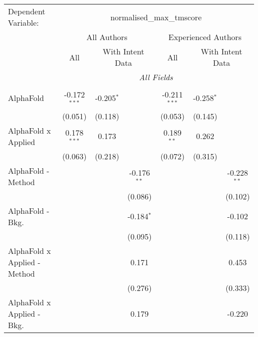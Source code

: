 \begingroup
\centering
\begin{tabular}{lcccccc}
   \tabularnewline \midrule \midrule
   Dependent Variable: & \multicolumn{6}{c}{normalised\_max\_tmscore}\\
 & \multicolumn{3}{c}{All Authors} & \multicolumn{3}{c}{Experienced Authors} \\
\cmidrule(lr){2-4} \cmidrule(lr){5-7}
 & \multicolumn{1}{c}{All} & \multicolumn{2}{c}{With Intent Data} & \multicolumn{1}{c}{All} & \multicolumn{2}{c}{With Intent Data} \\
\cmidrule(lr){2-2} \cmidrule(lr){3-4} \cmidrule(lr){5-5} \cmidrule(lr){6-7}
 & \multicolumn{6}{c}{\textit{All Fields}} \\ \\
   AlphaFold                      & -0.172$^{***}$ & -0.205$^{*}$  &               & -0.211$^{***}$ & -0.258$^{*}$  &   \\   
                                  & (0.051)        & (0.118)       &               & (0.053)        & (0.145)       &   \\   
   AlphaFold x Applied            & 0.178$^{***}$  & 0.173         &               & 0.189$^{**}$   & 0.262         &   \\   
                                  & (0.063)        & (0.218)       &               & (0.072)        & (0.315)       &   \\   
   AlphaFold - Method             &                &               & -0.176$^{**}$ &                &               & -0.228$^{**}$\\   
                                  &                &               & (0.086)       &                &               & (0.102)\\   
   AlphaFold - Bkg.               &                &               & -0.184$^{*}$  &                &               & -0.102\\   
                                  &                &               & (0.095)       &                &               & (0.118)\\   
   AlphaFold x Applied - Method   &                &               & 0.171         &                &               & 0.453\\   
                                  &                &               & (0.276)       &                &               & (0.333)\\   
   AlphaFold x Applied - Bkg.     &                &               & 0.179         &                &               & -0.220\\   

\end{tabular}
